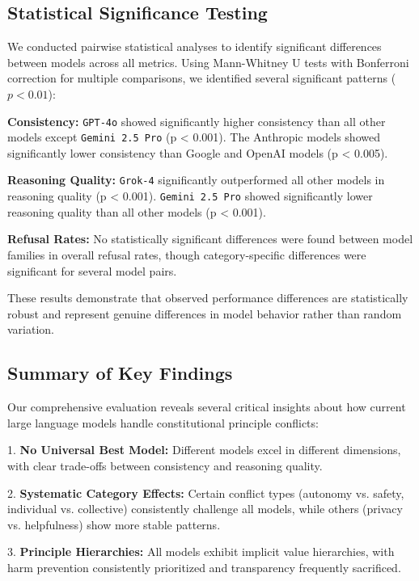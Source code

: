 \documentclass[11pt,a4paper]{article}
\newcommand{\model}[1]{\texttt{#1}}
\begin{document}
\subsection{Statistical Significance Testing}

We conducted pairwise statistical analyses to identify significant differences between models across all metrics. Using Mann-Whitney U tests with Bonferroni correction for multiple comparisons, we identified several significant patterns ($p < 0.01$):

\textbf{Consistency:} \model{GPT-4o} showed significantly higher consistency than all other models except \model{Gemini 2.5 Pro} (p < 0.001). The Anthropic models showed significantly lower consistency than Google and OpenAI models (p < 0.005).

\textbf{Reasoning Quality:} \model{Grok-4} significantly outperformed all other models in reasoning quality (p < 0.001). \model{Gemini 2.5 Pro} showed significantly lower reasoning quality than all other models (p < 0.001).

\textbf{Refusal Rates:} No statistically significant differences were found between model families in overall refusal rates, though category-specific differences were significant for several model pairs.

These results demonstrate that observed performance differences are statistically robust and represent genuine differences in model behavior rather than random variation.

\subsection{Summary of Key Findings}

Our comprehensive evaluation reveals several critical insights about how current large language models handle constitutional principle conflicts:

1. \textbf{No Universal Best Model:} Different models excel in different dimensions, with clear trade-offs between consistency and reasoning quality.

2. \textbf{Systematic Category Effects:} Certain conflict types (autonomy vs. safety, individual vs. collective) consistently challenge all models, while others (privacy vs. helpfulness) show more stable patterns.

3. \textbf{Principle Hierarchies:} All models exhibit implicit value hierarchies, with harm prevention consistently prioritized and transparency frequently sacrificed.
\end{document}
